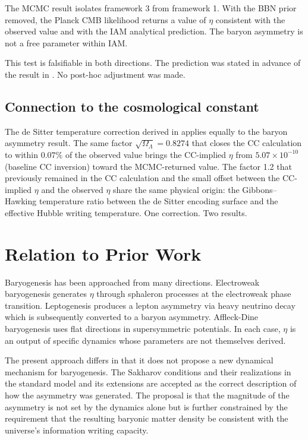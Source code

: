 \documentclass[12pt,a4paper]{article}
\begin{document}
The MCMC result isolates framework 3 from framework 1. With the BBN
prior removed, the Planck CMB likelihood returns a value of $\eta$
consistent with the observed value and with the IAM analytical
prediction. The baryon asymmetry is not a free parameter within IAM.

This test is falsifiable in both directions. The prediction was stated
in advance of the result in \citet{mahaffey2026_baryon_proposal}. No
post-hoc adjustment was made.

\subsection{Connection to the cosmological constant}

The de Sitter temperature correction derived in \citet{mahaffey2026_cc}
applies equally to the baryon asymmetry result. The same factor
$\sqrt{\Omega_\Lambda} = 0.8274$ that closes the CC calculation to
within $0.07\%$ of the observed value brings the CC-implied $\eta$
from $5.07 \times 10^{-10}$ (baseline CC inversion) toward the
MCMC-returned value. The factor 1.2 that previously remained in the
CC calculation and the small offset between the CC-implied $\eta$ and
the observed $\eta$ share the same physical origin: the
Gibbons--Hawking temperature ratio between the de Sitter encoding
surface and the effective Hubble writing temperature. One correction.
Two results.

\section{Relation to Prior Work}
\label{sec:prior}

Baryogenesis has been approached from many directions. Electroweak
baryogenesis \citep{rubakov1996} generates $\eta$ through sphaleron
processes at the electroweak phase transition. Leptogenesis
\citep{davidson2008} produces a lepton asymmetry via heavy neutrino
decay which is subsequently converted to a baryon asymmetry.
Affleck-Dine baryogenesis uses flat directions in supersymmetric
potentials. In each case, $\eta$ is an output of specific dynamics
whose parameters are not themselves derived.

The present approach differs in that it does not propose a new dynamical
mechanism for baryogenesis. The Sakharov conditions and their
realizations in the standard model and its extensions are accepted as
the correct description of how the asymmetry was generated. The proposal
is that the magnitude of the asymmetry is not set by the dynamics alone
but is further constrained by the requirement that the resulting
baryonic matter density be consistent with the universe's information
writing capacity.
\end{document}
